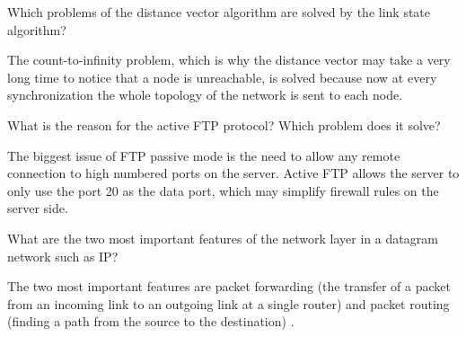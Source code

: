 \documentclass[12pt, oneside]{book}
\begin{document}
\begin{Exercise}
\end{Exercise}

\begin{Exercise}
\end{Exercise}

\begin{Exercise}
Which problems of the distance vector algorithm are solved by the link state algorithm?
\end{Exercise}
\begin{Answer}
The count-to-infinity problem, which is why the distance vector may take a very long time to notice that a node is unreachable, is solved because now at every synchronization the whole topology of the network is sent to each node.
\end{Answer}

\begin{Exercise}
\end{Exercise}

\begin{Exercise}
\end{Exercise}

\begin{Exercise}
\end{Exercise}

\begin{Exercise}
\end{Exercise}

\begin{Exercise}
\end{Exercise}

\begin{Exercise}
\end{Exercise}

\begin{Exercise}
\end{Exercise}

\begin{Exercise}
What is the reason for the active FTP protocol? Which problem does it solve?
\end{Exercise}
\begin{Answer}
The biggest issue of FTP passive mode is the need to allow any remote connection to high numbered ports on the server. Active FTP allows the server to only use the port 20 as the data port, which may simplify firewall rules on the server side.
\end{Answer}

\begin{Exercise}
What are the two most important features of the network layer in a datagram network such as IP?
\end{Exercise}
\begin{Answer}
The two most important features are packet forwarding (the transfer of a packet from an incoming link to an outgoing link at a single router) and packet routing (finding a path from the source to the destination) \cite[p.~305]{computer-networking-kurose-2012}.
\end{Answer}
\end{document}
